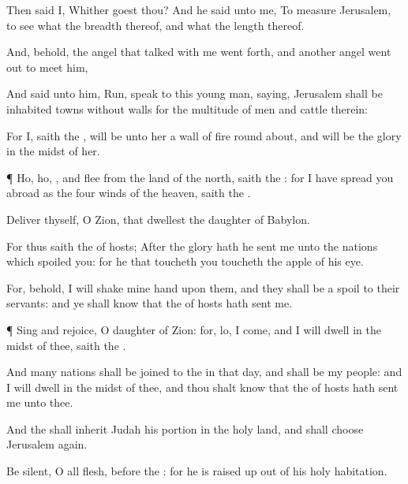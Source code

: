 {Then
said I, Whither
goest thou? And he
said unto me, To
measure
Jerusalem, to
see
what
{} the
breadth thereof, and what
{} the
length thereof.

And, behold, the
angel that
talked with me went
forth, and
another
angel went
out to
meet him,

And
said unto him,
Run,
speak to
this young
man,
saying,
Jerusalem shall be
inhabited
{} towns without
walls for the
multitude of
men and
cattle
therein:

For I,
saith the
{}, will be unto her a
wall of
fire round
about, and will be the
glory in the
midst of her.


\par }{\PP {}¶
Ho,
ho,
{}, and
flee from the
land of the
north,
saith the
{}: for I have spread you
abroad as the
four
winds of the
heaven,
saith the
{}.

Deliver thyself,
O
Zion, that
dwellest
{} the
daughter of
Babylon.

For thus
saith the
{} of
hosts;
After the
glory hath he
sent me unto the
nations which
spoiled you: for he that
toucheth you
toucheth the
apple of his
eye.

For, behold, I will
shake mine
hand upon them, and they shall be a
spoil to their
servants: and ye shall
know that the
{} of
hosts hath
sent me.


\par }{\PP {}¶
Sing and
rejoice, O
daughter of
Zion: for, lo, I
come, and I will
dwell in the
midst of thee,
saith the
{}.

And
many
nations shall be
joined to the
{} in that
day, and shall be my
people: and I will
dwell in the
midst of thee, and thou shalt
know that the
{} of
hosts hath
sent me unto thee.

And the
{} shall
inherit
Judah his
portion in the
holy
land, and shall
choose
Jerusalem again.

Be
silent, O all
flesh,
before the
{}: for he is raised
up out of his
holy
habitation.




\par }
